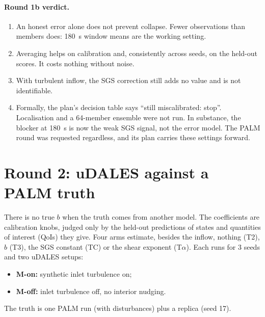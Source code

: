 \documentclass[11pt,a4paper]{article}
\begin{document}
\paragraph{Round 1b verdict.}
\begin{enumerate}
\item An honest error alone does not prevent collapse. Fewer observations
  than members does: \SI{180}{s} window means are the working setting.
\item Averaging helps on calibration and, consistently across seeds, on the
  held-out scores. It costs nothing without noise.
\item With turbulent inflow, the SGS correction still adds no value and is
  not identifiable.
\item Formally, the plan's decision table says ``still miscalibrated: stop''.
  Localisation and a 64-member ensemble were not run. In substance, the
  blocker at \SI{180}{s} is now the weak SGS signal, not the error model.
  The PALM round was requested regardless, and its plan carries these
  settings forward.
\end{enumerate}


\FloatBarrier
\section{Round 2: uDALES against a PALM truth}
\label{sec:r2}

There is no true $b$ when the truth comes from another model. The
coefficients are calibration knobs, judged only by the held-out predictions
of states and quantities of interest (QoIs) they give. Four arms estimate,
besides the inflow, nothing (T2), $b$ (T3), the SGS constant (TC) or the
shear exponent (T$\alpha$). Each runs for 3 seeds and two uDALES setups:
\begin{itemize}
\item \textbf{M-on:} synthetic inlet turbulence on;
\item \textbf{M-off:} inlet turbulence off, no interior nudging.
\end{itemize}
The truth is one PALM run (with disturbances) plus a replica (seed 17).
\end{document}
